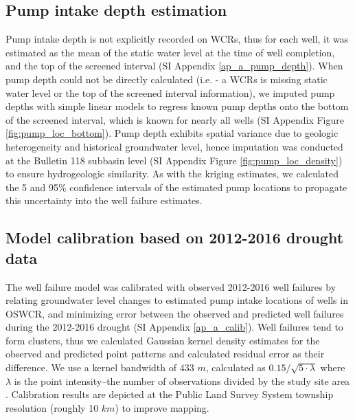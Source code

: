 \subsection{Pump intake depth estimation}

Pump intake depth is not explicitly recorded on WCRs, thus for each well, it was estimated as the mean of the static water level at the time of well completion, and the top of the screened interval (SI Appendix \ref{ap_a_pump_depth}). When pump depth could not be directly calculated (i.e. - a WCRs is missing static water level or the top of the screened interval information), we imputed pump depths with simple linear models to regress known pump depths onto the bottom of the screened interval, which is known for nearly all wells (SI Appendix Figure \ref{fig:pump_loc_bottom}). Pump depth exhibits spatial variance due to geologic heterogeneity and historical groundwater level, hence imputation was conducted at the Bulletin 118 subbasin level (SI Appendix Figure \ref{fig:pump_loc_density}) to ensure hydrogeologic similarity. As with the kriging estimates, we calculated the 5 and 95\% confidence intervals of the estimated pump locations to propagate this uncertainty into the well failure estimates.    

\subsection{Model calibration based on 2012-2016 drought data}

The well failure model was calibrated with observed 2012-2016 well failures by relating groundwater level changes to estimated pump intake locations of wells in OSWCR, and minimizing error between the observed and predicted well failures during the 2012-2016 drought (SI Appendix \ref{ap_a_calib}). Well failures tend to form clusters, thus we calculated Gaussian kernel density estimates for the observed and predicted point patterns and calculated residual error as their difference. We use a kernel bandwidth of 433 $m$, calculated as $0.15 / \sqrt{5 \cdot \lambda}$ where $\lambda$ is the point intensity--the number of observations divided by the study site area \citep{stoyan1994fractals}. Calibration results are depicted at the Public Land Survey System \citep{us2009manual} township resolution (roughly 10 $km$) to improve mapping.




